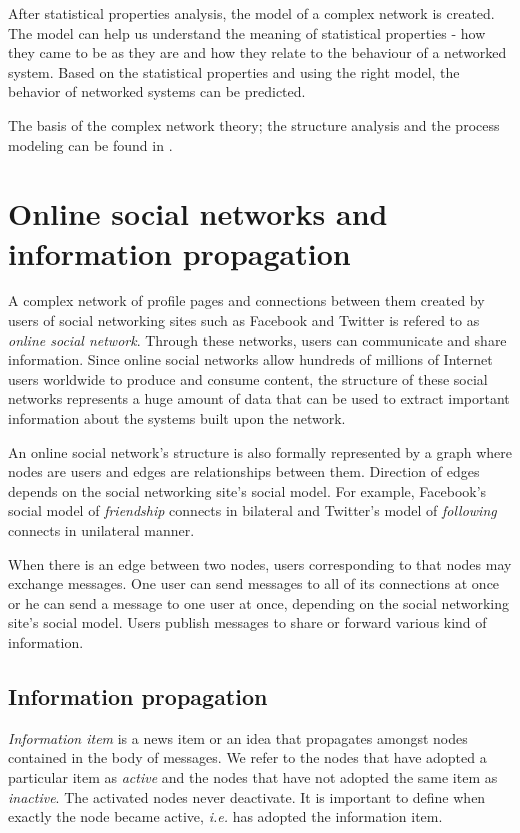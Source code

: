 \documentclass[times, utf8, zavrsni]{fer}
\begin{document}
After statistical properties analysis, the model of a complex network is created. The model can help us understand the meaning of statistical properties - how they came to be as they are and how they relate to the behaviour of a networked system. Based on the statistical properties and using the right model, the behavior of networked systems can be predicted.

The basis of the complex network theory; the structure  analysis and the process modeling can be found in \cite{Newman03thestructure}.

\chapter{Online social networks and information propagation}

A complex network of profile pages and connections between them created by      users of social networking sites such as Facebook and Twitter is refered to as \emph{online social network}. Through these networks, users can communicate and share information. Since online social networks allow hundreds of millions of Internet users worldwide to produce and consume content, the structure of these social networks represents a huge amount of data that can be used  to extract important information about the systems built upon the network. 

An online social network's structure is also formally represented by a graph where nodes are users and edges are relationships between them. Direction of edges depends on the social networking site's social model. For example, Facebook's social model of \emph{friendship} connects in bilateral and Twitter's model of \emph{following} connects in unilateral manner. 

When there is an edge between two nodes, users corresponding to that nodes may exchange messages. One user can send messages to all of its connections at once or he can send a message to one user at once, depending on the social networking site's social model. Users publish messages to share or forward various kind of information.

\section{Information propagation}

\emph{Information item} is a news item or an idea that propagates amongst nodes contained in the body of messages. We refer to the nodes that have adopted a  particular item as \emph{active} and the nodes that have not adopted the same item as \emph{inactive}. The activated nodes never deactivate. It is important to define when exactly the node became active, \emph{i.e.} has adopted the information item.
\end{document}
